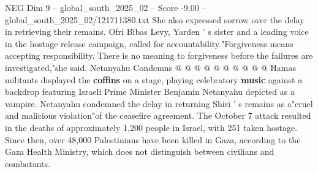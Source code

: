 \begin{textsample}{NEG Dim 9 – global\_south\_2025\_02 – Score -9.00 – global\_south\_2025\_02/121711380.txt}
She also expressed sorrow over the delay in retrieving their remains.
Ofri Bibas Levy, Yarden ' s sister and a leading voice in the hostage release campaign, called for accountability."Forgiveness means accepting responsibility.
There is no meaning to forgiveness before the failures are investigated,"she said.
Netanyahu Condemns @ @ @ @ @ @ @ @ @ @ Hamas militants displayed the \textbf{coffins} on a stage, playing celebratory \textbf{music} against a backdrop featuring Israeli Prime Minister Benjamin Netanyahu depicted as a vampire.
Netanyahu condemned the delay in returning Shiri ' s remains as a"cruel and malicious violation"of the ceasefire agreement.
The October 7 attack resulted in the deaths of approximately 1,200 people in Israel, with 251 taken hostage.
Since then, over 48,000 Palestinians have been killed in Gaza, according to the Gaza Health Ministry, which does not distinguish between civilians and combatants.

\end{textsample}
